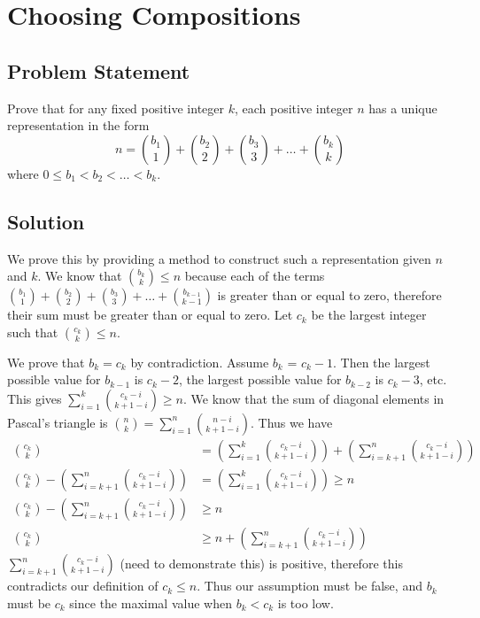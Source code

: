 \documentclass[12pt]{article}
\newcommand{\ProblemStatement}[1]{
\subsection*{Problem Statement}
#1
\subsection*{Solution}
}
\begin{document}
\section{Choosing Compositions}
\ProblemStatement{
Prove that for any fixed positive integer $k$, each positive integer $n$ has a unique representation in the form 
\[
    n = \binom{b_1}{1} + \binom{b_2}{2} + \binom{b_3}{3} +\dots + \binom{b_k}{k} 
\]
where $0 \le b_1 < b_2 < \dots < b_k$.
}

We prove this by providing a method to construct such a representation given $n$ and $k$.
We know that $\binom{b_k}{k} \le n$ because each of the terms $\binom{b_1}{1} + \binom{b_2}{2} + \binom{b_3}{3} +\dots + \binom{b_{k-1}}{k-1}$ is greater than or equal to zero, therefore their sum must be greater than or equal to zero. Let $c_k$ be the largest integer such that $\binom{c_k}{k} \le n$. 

We prove that $b_k = c_k$ by contradiction. Assume $b_k$ = $c_k - 1$. Then the largest possible value for $b_{k-1}$ is $c_k-2$, the largest possible value for $b_{k-2}$ is $c_k-3$, etc. This gives $\sum_{i=1}^{k} \binom{c_k-i}{k+1-i} \ge n$. We know that the sum of diagonal elements in Pascal's triangle is $\binom{n}{k} = \sum_{i=1}^{n} \binom{n-i}{k+1-i}$. Thus we have
\begin{align*}
    \binom{c_k}{k} &= \left(\sum_{i=1}^{k} \binom{c_k-i}{k+1-i}\right)+\left(\sum_{i=k+1}^{n} \binom{c_k-i}{k+1-i}\right)\\
    \binom{c_k}{k} - \left(\sum_{i=k+1}^{n} \binom{c_k-i}{k+1-i}\right)&= \left(\sum_{i=1}^{k} \binom{c_k-i}{k+1-i}\right) \ge n\\
    \binom{c_k}{k} - \left(\sum_{i=k+1}^{n} \binom{c_k-i}{k+1-i}\right)&\ge n\\
    \binom{c_k}{k} &\ge n + \left(\sum_{i=k+1}^{n} \binom{c_k-i}{k+1-i}\right)
\end{align*}
$\sum_{i=k+1}^{n} \binom{c_k-i}{k+1-i}$ (need to demonstrate this) is positive, therefore this contradicts our definition of $c_k \le n$. Thus our assumption must be false, and $b_k$ must be $c_k$ since the maximal value when $b_k < c_k$ is too low.  
\end{document}
